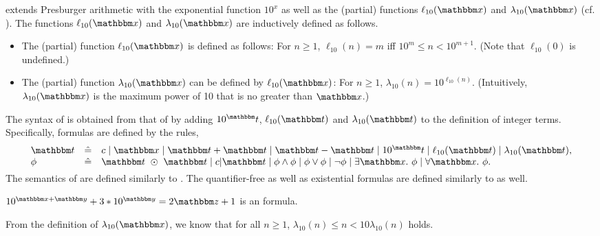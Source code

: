 {\paexp} extends Presburger arithmetic with the exponential function $10^x$ as well as the (partial) functions $\ell_{10}(\ivarx)$ and $\lambda_{10}(\ivarx)$ (cf. \cite{Point86}). The functions $\ell_{10}(\ivarx)$ and $\lambda_{10}(\ivarx)$ are inductively defined as follows.
\begin{itemize}
\item The (partial) function $\ell_{10}(\ivarx)$ is defined as follows: For $n \ge 1$, $\ell_{10}(n) = m$ iff $10^m \le n < 10^{m+1}$. (Note that $\ell_{10}(0)$ is undefined.) 
%
\item The (partial) function $\lambda_{10}(\ivarx)$ can be defined by $\ell_{10}(\ivarx)$: For $n \ge 1$, $\lambda_{10}(n) = 10^{\ell_{10}(n)}$. (Intuitively, $\lambda_{10}(\ivarx)$ is the maximum power of 10 that is no greater than $\ivarx$.)
\end{itemize}

The syntax of {\paexp} is obtained from that of {\pa} by adding $10^\iterm$, $\ell_{10}(\iterm)$ and $\lambda_{10}(\iterm)$ to the definition of integer terms. Specifically, {\paexp} formulas are defined by the rules,
%
\vspace{-1mm}
 $$
 \begin{array}{ l c l}
 \iterm &\Def& c \mid \ivarx \mid \iterm + \iterm \mid \iterm - \iterm \mid 10^\iterm \mid \ell_{10}(\iterm) \mid \lambda_{10}(\iterm), \\
\vspace{-1mm}
 \phi &\Def & \iterm \ \op\ \iterm \mid c | \iterm \mid \phi \wedge \phi \mid \phi \vee \phi \mid \neg \phi \mid \exists \ivarx.\ \phi \mid \forall \ivarx.\ \phi.
 \end{array}
 $$
 The semantics of {\paexp} are defined similarly to {\pa}. The quantifier-free as well as existential {\paexp} formulas are defined similarly to {\pa} as well.

\begin{example}
$10^{\ivarx+ \ivary} + 3 * 10^{\ivary}  = 2 \ivarz +1 $ is an {\paexp} formula.
\end{example} 
 
From the definition of $\lambda_{10}(\ivarx)$, we know that for all $n \ge 1$, $\lambda_{10}(n) \le n < 10\lambda_{10}(n)$ holds.


